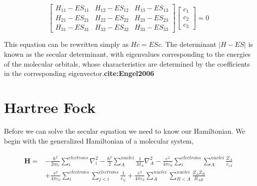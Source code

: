 \begin{equation} \label{eq:SchrodingerMatrix}
  \begin{bmatrix}
    H_{11}-ES_{11} & H_{12}-ES_{12} & H_{13}-ES_{13} \\
    H_{21}-ES_{21} & H_{22}-ES_{22} & H_{23}-ES_{23} \\
    H_{31}-ES_{31} & H_{32}-ES_{32} & H_{33}-ES_{33}
  \end{bmatrix}
  \begin{bmatrix}
    c_1 \\
    c_2 \\
    c_3
  \end{bmatrix} = 0
\end{equation}

This equation can be rewritten simply as $Hc=ESc$. The determinant
$\left| H-ES \right|$ is known as the secular determinant, with
eigenvalues corresponding to the energies of the molecular orbitals,
whose characteristics are determined by the coefficients in the
corresponding eigenvector.\textbf{cite:Engel2006}

\section{Hartree Fock}
    Before we can solve the secular equation we need to know our
    Hamiltonian.  We begin with the generalized Hamiltonian of a
    molecular system,\cite{Engel2006}

    \begin{align} \label{eq:fullhamiltonian}
      \begin{split}
      \bm{H} =& -\frac{\hbar^2}{2m_e}\sum_i^{electrons}\nabla_i^2-\frac{\hbar^2}{2}\sum_{A}^{nuclei}\frac{1}{M_{A}}\nabla_{A}^2 - \frac{e^2}{4\pi\varepsilon_0} \sum_i^{electrons}\sum_A^{nuclei}\frac{Z_A}{r_{iA}} \\
      & + \frac{e^2}{4\pi\varepsilon_0}\sum_{i}^{electrons}\sum_{j<i}^{electrons}\frac{1}{r_{ij}} + \frac{e^2}{4\pi\varepsilon_0}\sum_{A}^{nuclei}\sum_{B<A}^{nuclei}\frac{Z_AZ_B}{R_{AB}}
      \end{split}
    \end{align}


